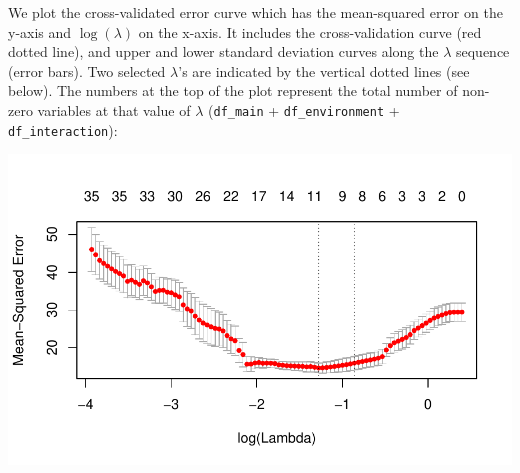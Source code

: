 			\begin{knitrout}\scriptsize
			\color{fgcolor}\begin{kframe}
			\begin{alltt}
			\hlstd{(}\hlstd{)} 
			\hlstd{(} \hlstd{=} \hlstd{)}
			 \hlkwb{<-} \hlstd{(} \hlopt{$}  \hlopt{$}  \hlopt{$}  
			 \hlstd{=} \hlstd{,}  \hlstd{=} \hlstd{)}
		\end{alltt}
	\end{kframe}
\end{knitrout}

We plot the cross-validated error curve which has the mean-squared error on the y-axis and $\log(\lambda)$ on the x-axis. It includes the cross-validation curve (red dotted line), and upper and lower standard deviation curves along the $\lambda$ sequence (error bars). Two selected $\lambda$'s are indicated by the vertical dotted lines (see below). The numbers at the top of the plot represent the total number of non-zero variables at that value of $\lambda$ (\texttt{df\_main} + \texttt{df\_environment} + \texttt{df\_interaction}):


\begin{knitrout}\scriptsize
	\color{fgcolor}\begin{kframe}
		\begin{alltt}
			\hlstd{(cvfit)}
		\end{alltt}
	\end{kframe}
	
	{\centering \includegraphics[width=1\linewidth]{figs/sail-cv-1} 
		
	}
	
	
	
\end{knitrout}

